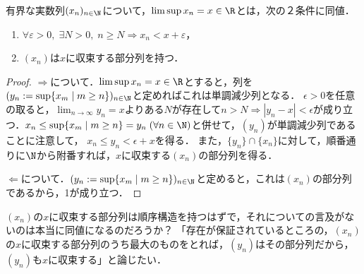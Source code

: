 \documentclass[uplatex, dvipdfmx]{jsreport}
\begin{document}
\begin{proposition}[上極限の特徴付け]\label{prop-characterization-of-limsup}
    有界な実数列$(x_n)_{n\in\N}$について，$\limsup x_n=x\in\R$とは，次の２条件に同値．
    \begin{enumerate}
        \item $\forall\varepsilon>0,\;\exists N>0,\; n\ge N\Rightarrow x_n<x+\varepsilon$，
        \item $(x_n)$は$x$に収束する部分列を持つ．
    \end{enumerate}
\end{proposition}
\begin{proof}
    $\Rightarrow$について．$\limsup x_n=x\in\R$とすると，列を$(y_n:=\sup\{x_m\mid m\ge n\})_{n\in\N}$と定めればこれは単調減少列となる．
    $\epsilon>0$を任意の取ると，$\lim_{n\to\infty}y_n=x$よりある$N$が存在して$n>N\Rightarrow|y_n-x|<\epsilon$が成り立つ．$x_n\le\sup\{x_m\mid m\ge n\}=y_n\;(\forall n\in\N)$と併せて，$(y_n)$が単調減少列であることに注意して，
    $x_n\le y_n<\epsilon+x$を得る．
    また，$\{y_n\}\cap\{x_n\}$に対して，順番通りに$\N$から附番すれば，$x$に収束する$(x_n)$の部分列を得る．

    $\Leftarrow$について．$(y_n:=\sup\{x_m\mid m\ge n\})_{n\in\N}$と定めると，これは$(x_n)$の部分列であるから，1が成り立つ．
\end{proof}
\begin{remark}
    $(x_n)$の$x$に収束する部分列は順序構造を持つはずで，それについての言及がないのは本当に同値になるのだろうか？
    「存在が保証されているところの，$(x_n)$の$x$に収束する部分列のうち最大のものをとれば，$(y_n)$はその部分列だから，$(y_n)$も$x$に収束する」と論じたい．
\end{remark}
\end{document}
